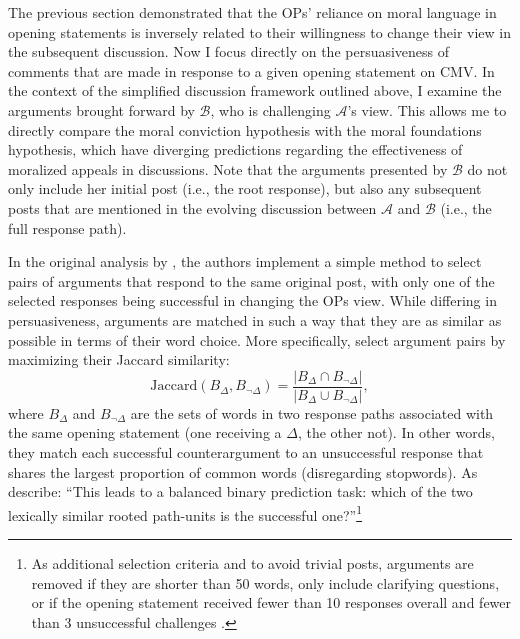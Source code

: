 
The previous section demonstrated that the OPs' reliance on moral language in opening statements is inversely related to their willingness to change their view in the subsequent discussion. Now I focus directly on the persuasiveness of comments that are made in response to a given opening statement on CMV. In the context of the simplified discussion framework outlined above, I examine the arguments brought forward by $\mathcal{B}$, who is challenging $\mathcal{A}$'s view. This allows me to directly compare the moral conviction hypothesis with the moral foundations hypothesis, which have diverging predictions regarding the effectiveness of moralized appeals in discussions. Note that the arguments presented by $\mathcal{B}$ do not only include her initial post (i.e., the root response), but also any subsequent posts that are mentioned in the evolving discussion between $\mathcal{A}$ and $\mathcal{B}$ (i.e., the full response path).

In the original analysis by \citet{tan2016winning}, the authors implement a simple method to select pairs of arguments that respond to the same original post, with only one of the selected responses being successful in changing the OPs view. While differing in persuasiveness, arguments are matched in such a way that they are as similar as possible in terms of their word choice. More specifically, \citet{tan2016winning} select argument pairs by maximizing their Jaccard similarity:
\begin{equation}
\text{Jaccard}(B_\Delta,B_{\neg\Delta})=\dfrac{|B_\Delta\cap B_{\neg\Delta}|}{|B_\Delta\cup B_{\neg\Delta}|},
\end{equation}
where $B_\Delta$ and $B_{\neg\Delta}$ are the sets of words in two response paths associated with the same opening statement (one receiving a $\Delta$, the other not). In other words, they match each successful counterargument to an unsuccessful response that shares the largest proportion of common words (disregarding stopwords). As \citet[617]{tan2016winning} describe: ``This leads to a balanced binary prediction task: which of the two lexically similar rooted path-units is the successful one?''\footnote{As additional selection criteria and to avoid trivial posts, arguments are removed if they are shorter than 50 words, only include clarifying questions, or if the opening statement received fewer than 10 responses overall and fewer than 3 unsuccessful challenges \citep[see][617 for details]{tan2016winning}.}


